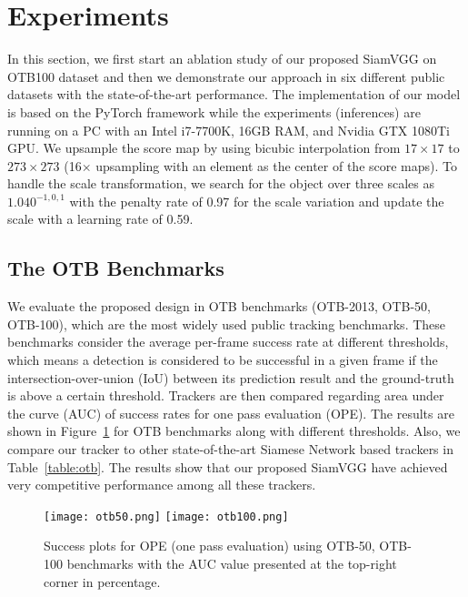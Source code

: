 \documentclass[runningheads]{llncs}
\begin{document}
\section{Experiments}
\label{sec:Experiments}


In this section, we first start an ablation study of our proposed SiamVGG on OTB100 dataset and then we demonstrate our approach in six different public datasets with the state-of-the-art performance. The implementation of our model is based on the PyTorch framework while the experiments (inferences) are running on a PC with an Intel i7-7700K, 16GB RAM, and Nvidia GTX 1080Ti GPU. 
We upsample the score map by using bicubic interpolation from $17 \times 17$ to $273 \times 273$ (16$\times$ upsampling with an element as the center of the score maps). To handle the scale transformation, we search for the object over three scales as $1.040^{-1,0,1}$ with the penalty rate of 0.97 for the scale variation and update the scale with a learning rate of 0.59.


\subsection{The OTB Benchmarks}

We evaluate the proposed design in OTB benchmarks (OTB-2013, OTB-50, OTB-100), which are the most widely used public tracking benchmarks. These benchmarks consider the average per-frame success rate at different thresholds, which means a detection is considered to be successful in a given frame if the intersection-over-union (IoU) between its prediction result and the ground-truth is above a certain threshold. Trackers are then compared regarding area under the curve (AUC) of success rates for one pass evaluation (OPE). The results are shown in Figure~\ref{fig:otb} for OTB benchmarks along with different thresholds. Also, we compare our tracker to other state-of-the-art Siamese Network based trackers in Table~\ref{table:otb}. The results show that our proposed SiamVGG have achieved very competitive performance among all these trackers.


\begin{figure}
\centering
\texttt{[image: otb50.png]}\hfill
\texttt{[image: otb100.png]}

\caption{Success plots for OPE (one pass evaluation) using OTB-50, OTB-100 benchmarks with the AUC value presented at the top-right corner in percentage.}

\label{fig:otb}
\end{figure}
\end{document}
